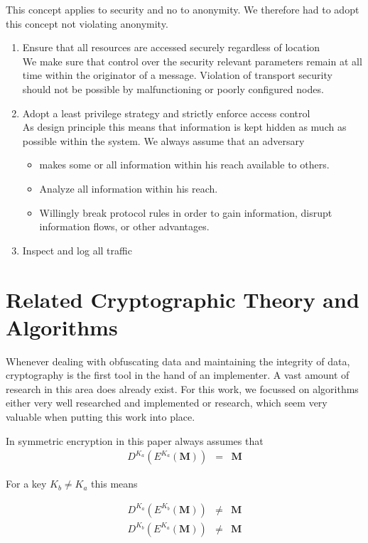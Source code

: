 This concept applies to security and no to anonymity. We therefore had to adopt this concept not violating anonymity.
\begin{enumerate}
	\item Ensure that all resources are accessed securely regardless of location\\
	We make sure that control over the security relevant parameters remain at all time within the originator of a message. Violation of transport security should not be possible by malfunctioning or poorly configured nodes.
	\item Adopt a least privilege strategy and strictly enforce access control\\
	As design principle this means that information is kept hidden as much as possible within the system. We always assume that an adversary
	\begin{itemize}
		\item makes some or all information within his reach available to others.
		\item Analyze all information within his reach.
		\item Willingly break protocol rules in order to gain information, disrupt information flows, or other advantages.
	\end{itemize}		
	\item Inspect and log all traffic
	
\end{enumerate}

\chapter{Related Cryptographic Theory and Algorithms}

Whenever dealing with obfuscating data and maintaining the integrity of data, cryptography is the first tool in the hand of an implementer. A vast amount of research in this area does already exist. For this work, we focussed on algorithms either very well researched and implemented or research, which seem very valuable when putting this work into place. 

In symmetric encryption in this paper always assumes that
\begin{eqnarray}
D^{K_a}\left(E^{K_a}\left(\mathbf{M}\right)\right) & = & \mathbf{M}
\end{eqnarray} 

For a key $K_b\neq K_a$ this means

\begin{eqnarray}
D^{K_a}\left(E^{K_b}\left(\mathbf{M}\right)\right) & \neq & \mathbf{M}\\
D^{K_b}\left(E^{K_a}\left(\mathbf{M}\right)\right) & \neq & \mathbf{M}
\end{eqnarray} 

